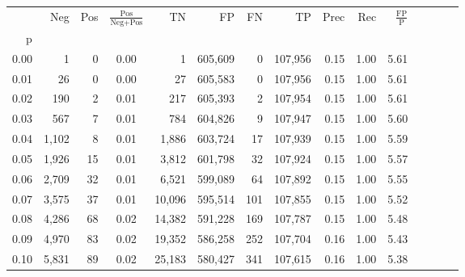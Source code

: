 \begin{tabular}{rrrcrrrrrrrrrrr}
\toprule
{} &     Neg &    Pos & $\frac{\text{Pos}}{\text{Neg}+\text{Pos}}$ &       TN &       FP &       FN &       TP &  Prec &   Rec & $\frac{\text{FP}}{\text{P}}$ \\
p    &         &        &                                            &          &          &          &          &       &       &                              \\
\midrule
0.00 &       1 &      0 &                                       0.00 &        1 &  605,609 &        0 &  107,956 &  0.15 &  1.00 &                         5.61 \\
0.01 &      26 &      0 &                                       0.00 &       27 &  605,583 &        0 &  107,956 &  0.15 &  1.00 &                         5.61 \\
0.02 &     190 &      2 &                                       0.01 &      217 &  605,393 &        2 &  107,954 &  0.15 &  1.00 &                         5.61 \\
0.03 &     567 &      7 &                                       0.01 &      784 &  604,826 &        9 &  107,947 &  0.15 &  1.00 &                         5.60 \\
0.04 &   1,102 &      8 &                                       0.01 &    1,886 &  603,724 &       17 &  107,939 &  0.15 &  1.00 &                         5.59 \\
0.05 &   1,926 &     15 &                                       0.01 &    3,812 &  601,798 &       32 &  107,924 &  0.15 &  1.00 &                         5.57 \\
0.06 &   2,709 &     32 &                                       0.01 &    6,521 &  599,089 &       64 &  107,892 &  0.15 &  1.00 &                         5.55 \\
0.07 &   3,575 &     37 &                                       0.01 &   10,096 &  595,514 &      101 &  107,855 &  0.15 &  1.00 &                         5.52 \\
0.08 &   4,286 &     68 &                                       0.02 &   14,382 &  591,228 &      169 &  107,787 &  0.15 &  1.00 &                         5.48 \\
0.09 &   4,970 &     83 &                                       0.02 &   19,352 &  586,258 &      252 &  107,704 &  0.16 &  1.00 &                         5.43 \\
0.10 &   5,831 &     89 &                                       0.02 &   25,183 &  580,427 &      341 &  107,615 &  0.16 &  1.00 &                         5.38 \\

\end{tabular}
